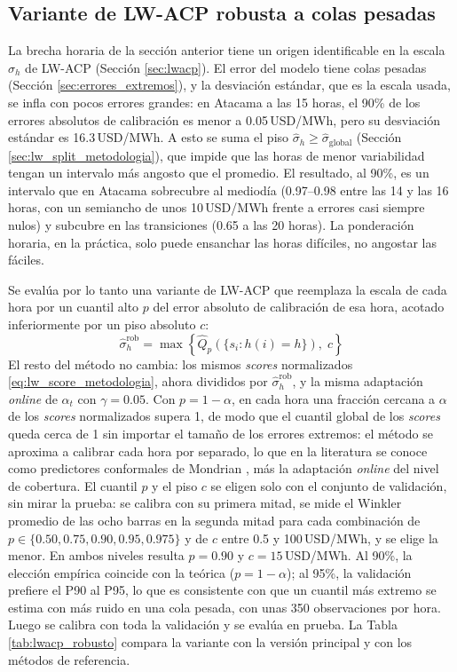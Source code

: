 \subsection{Variante de LW-ACP robusta a colas pesadas}
\label{sec:lwacp_robusto}

La brecha horaria de la sección anterior tiene un origen identificable en la escala $\hat\sigma_h$ de LW-ACP (Sección \ref{sec:lwacp}). El error del modelo tiene colas pesadas (Sección \ref{sec:errores_extremos}), y la desviación estándar, que es la escala usada, se infla con pocos errores grandes: en Atacama a las 15 horas, el 90\% de los errores absolutos de calibración es menor a 0.05\,USD/MWh, pero su desviación estándar es 16.3\,USD/MWh. A esto se suma el piso $\hat\sigma_h \geq \hat\sigma_{\text{global}}$ (Sección \ref{sec:lw_split_metodologia}), que impide que las horas de menor variabilidad tengan un intervalo más angosto que el promedio. El resultado, al 90\%, es un intervalo que en Atacama sobrecubre al mediodía (0.97--0.98 entre las 14 y las 16 horas, con un semiancho de unos 10\,USD/MWh frente a errores casi siempre nulos) y subcubre en las transiciones (0.65 a las 20 horas). La ponderación horaria, en la práctica, solo puede ensanchar las horas difíciles, no angostar las fáciles.

Se evalúa por lo tanto una variante de LW-ACP que reemplaza la escala de cada hora por un cuantil alto $p$ del error absoluto de calibración de esa hora, acotado inferiormente por un piso absoluto $c$:
\begin{equation}
    \hat\sigma_h^{\text{rob}} = \max\left\{\hat{Q}_{p}\left(\{s_i : h(i) = h\}\right),\; c\right\}
    \label{eq:sigma_robusto}
\end{equation}
El resto del método no cambia: los mismos \textit{scores} normalizados \eqref{eq:lw_score_metodologia}, ahora divididos por $\hat\sigma_h^{\text{rob}}$, y la misma adaptación \textit{online} de $\alpha_t$ con $\gamma = 0.05$. Con $p = 1-\alpha$, en cada hora una fracción cercana a $\alpha$ de los \textit{scores} normalizados supera 1, de modo que el cuantil global de los \textit{scores} queda cerca de 1 sin importar el tamaño de los errores extremos: el método se aproxima a calibrar cada hora por separado, lo que en la literatura se conoce como predictores conformales de Mondrian \cite{VovkCP}, más la adaptación \textit{online} del nivel de cobertura. El cuantil $p$ y el piso $c$ se eligen solo con el conjunto de validación, sin mirar la prueba: se calibra con su primera mitad, se mide el Winkler promedio de las ocho barras en la segunda mitad para cada combinación de $p \in \{0.50, 0.75, 0.90, 0.95, 0.975\}$ y de $c$ entre 0.5 y 100\,USD/MWh, y se elige la menor. En ambos niveles resulta $p = 0.90$ y $c = 15$\,USD/MWh. Al 90\%, la elección empírica coincide con la teórica ($p = 1-\alpha$); al 95\%, la validación prefiere el P90 al P95, lo que es consistente con que un cuantil más extremo se estima con más ruido en una cola pesada, con unas 350 observaciones por hora. Luego se calibra con toda la validación y se evalúa en prueba. La Tabla \ref{tab:lwacp_robusto} compara la variante con la versión principal y con los métodos de referencia.

